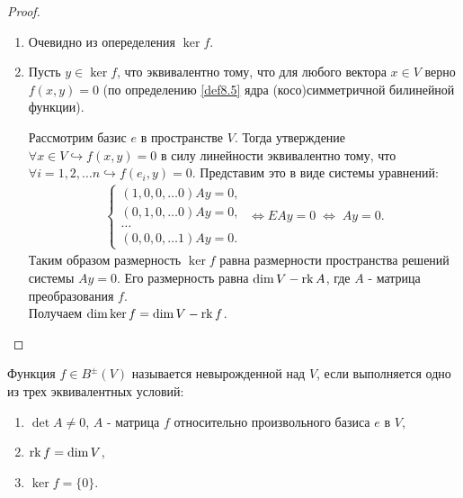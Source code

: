 \begin{proof}~
    \begin{enumerate}
        \item Очевидно из опеределения $\ker f$.
        \item Пусть $y \in \ker f$, что эквивалентно тому, что для любого вектора $x \in V$ верно 
        $f(x, y) = 0$ (по определению \ref{def8.5} ядра (косо)симметричной билинейной функции). 

        Рассмотрим базис $e$ в пространстве $V$. Тогда утверждение $\forall x \in V \hookrightarrow 
        f(x, y) = 0$ в силу линейности эквивалентно тому, что $\forall i = 1, 2, \dots n 
        \hookrightarrow f(e_i, y) = 0$. Представим это в виде системы уравнений:
        \begin{gather*}
            \begin{cases*}
            (1, 0, 0, \dots 0) A y = 0, \\
            (0, 1, 0, \dots 0) A y = 0, \\
            \dots                       \\
            (0, 0, 0, \dots 1) A y = 0.
            \end{cases*} \; \Leftrightarrow E A y = 0 \; \Leftrightarrow \; Ay = 0.
        \end{gather*} 
        Таким образом размерность $\ker f$ равна размерности пространства решений системы $Ay = 0$. 
        Его размерность равна $\dim V - \operatorname{rk} A$, где $A$ - матрица преобразования $f$. \\ 
        Получаем $\dim \ker f = \dim V - \operatorname{rk} f$.
    \end{enumerate}
\end{proof}

\begin{definition}
    Функция $f \in B^{\pm}(V)$ называется невырожденной над $V$, если выполняется одно из трех 
    эквивалентных условий:
    \begin{enumerate}
        \item $\det A \neq 0$, $A$ - матрица $f$ относительно произвольного базиса $e$ в $V$,
        \item $\operatorname{rk} f = \dim V$,
        \item $\ker f = \{0\}$.
    \end{enumerate}
\end{definition}

